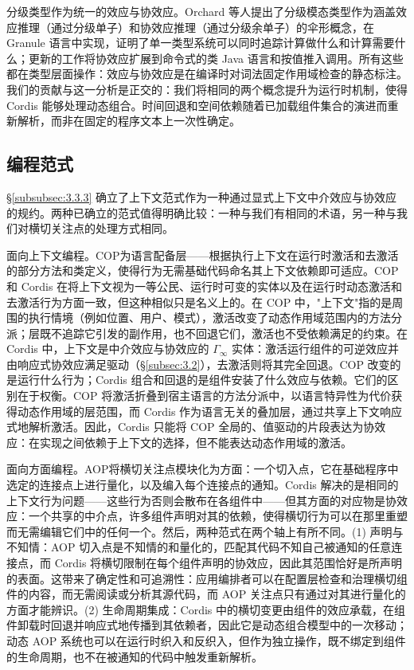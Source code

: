 分级类型作为统一的效应与协效应。Orchard 等人\cite{ref88}提出了分级模态类型作为涵盖效应推理（通过分级单子）和协效应推理（通过分级余单子）的伞形概念，在 Granule 语言中实现，证明了单一类型系统可以同时追踪计算做什么和计算需要什么；更新的工作将协效应扩展到命令式的类 Java 语言\cite{ref89,ref90}和按值推入调用\cite{ref91}。所有这些都在类型层面操作：效应与协效应是在编译时对词法固定作用域检查的静态标注。我们的贡献与这一分析是正交的：我们将相同的两个概念提升为运行时机制，使得 Cordis 能够处理动态组合。时间回退和空间依赖随着已加载组件集合的演进而重新解析，而非在固定的程序文本上一次性确定。

\subsection{编程范式}
\label{sec:7.2}

\S\ref{subsubsec:3.3.3} 确立了上下文范式作为一种通过显式上下文中介效应与协效应的规约。两种已确立的范式值得明确比较：一种与我们有相同的术语，另一种与我们对横切关注点的处理方式相同。

面向上下文编程。COP\cite{ref92,ref93}为语言配备层——根据执行上下文在运行时激活和去激活的部分方法和类定义，使得行为无需基础代码命名其上下文依赖即可适应\cite{ref94}。COP 和 Cordis 在将上下文视为一等公民、运行时可变的实体以及在运行时动态激活和去激活行为方面一致，但这种相似只是名义上的。在 COP 中，"上下文"指的是周围的执行情境（例如位置、用户、模式），激活改变了动态作用域范围内的方法分派；层既不追踪它引发的副作用，也不回退它们，激活也不受依赖满足的约束。在 Cordis 中，上下文是中介效应与协效应的 $\Gamma_\infty$ 实体：激活运行组件的可逆效应并由响应式协效应满足驱动（\S\ref{subsec:3.2}），去激活则将其完全回退。COP 改变的是运行什么行为；Cordis 组合和回退的是组件安装了什么效应与依赖。它们的区别在于权衡。COP 将激活折叠到宿主语言的方法分派中，以语言特异性为代价获得动态作用域的层范围，而 Cordis 作为语言无关的叠加层，通过共享上下文响应式地解析激活。因此，Cordis 只能将 COP 全局的、值驱动的片段表达为协效应：在实现之间依赖于上下文的选择，但不能表达动态作用域的激活。

面向方面编程。AOP\cite{ref95,ref96}将横切关注点模块化为方面：一个切入点，它在基础程序中选定的连接点上进行量化，以及编入每个连接点的通知。Cordis 解决的是相同的上下文行为问题——这些行为否则会散布在各组件中——但其方面的对应物是协效应：一个共享的中介点，许多组件声明对其的依赖，使得横切行为可以在那里重塑而无需编辑它们中的任何一个。然后，两种范式在两个轴上有所不同。(1) 声明与不知情：AOP 切入点是不知情的和量化的，匹配其代码不知自己被通知的任意连接点，而 Cordis 将横切限制在每个组件声明的协效应，因此其范围恰好是所声明的表面。这带来了确定性和可追溯性：应用编排者可以在配置层检查和治理横切组件的内容，而无需阅读或分析其源代码，而 AOP 关注点只有通过对其进行量化的方面才能辨识。(2) 生命周期集成：Cordis 中的横切变更由组件的效应承载，在组件卸载时回退并响应式地传播到其依赖者，因此它是动态组合模型中的一次移动；动态 AOP 系统\cite{ref97,ref98}也可以在运行时织入和反织入，但作为独立操作，既不绑定到组件的生命周期，也不在被通知的代码中触发重新解析。

